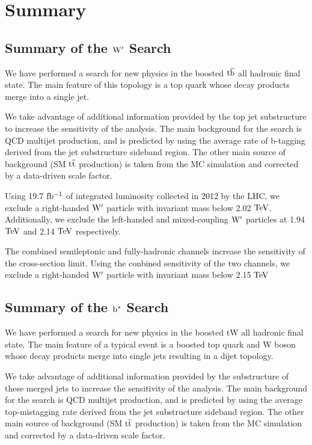 \clearpage
\newpage
\chapter{Summary}

\section{Summary of the $\mathrm{W}^{\prime}$ Search}
We have performed a search for new physics in the boosted $\mathrm{t\overline{b}}$ all
hadronic final state.  The main feature of this topology is a top quark
whose decay products merge into a single jet. 

We take advantage of additional information provided by the top jet
substructure to increase the sensitivity of the analysis.  The main background for
the search is QCD multijet production, and is predicted by using the
average rate of b-tagging derived from the jet substructure sideband
region.  The other main source of background (SM $\mathrm{t\overline{t}}$ production) is taken from 
the MC simulation and corrected by a data-driven scale factor.

Using 19.7$~\mathrm{fb^{-1}}$ of integrated luminosity collected in 2012 by the
LHC, we exclude a right-handed $\mathrm{W}^{\prime}$ particle with invariant mass
below 2.02 $\mathrm{TeV}$.  Additionally, we exclude the left-handed and mixed-coupling $\mathrm{W}^{\prime}$ particles at 1.94 $\mathrm{TeV}$ and 2.14 $\mathrm{TeV}$ respectively.

The combined semileptonic and fully-hadronic channels increase the sensitivity of the cross-section limit.  
Using the conbined sensitivity of the two channels, we exclude a right-handed $\mathrm{W}^{\prime}$ particle with invariant mass below 2.15$~\mathrm{TeV}$  



\section{Summary of the $\mathrm{b}^{*}$ Search}
We have performed a search for new physics in the boosted tW all
hadronic final state.  The main feature of a typical event is a boosted top quark and W boson
whose decay products merge into single jets resulting in a dijet topology. 

We take advantage of additional information provided by the 
substructure of these merged jets  to increase the sensitivity of the analysis.  The main background for
the search is QCD multijet production, and is predicted by using the
average top-mistagging rate derived from the jet substructure sideband
region.  The other main source of background (SM $\mathrm{t\overline{t}}$ production) is taken from 
the MC simulation and corrected by a data-driven scale factor.

